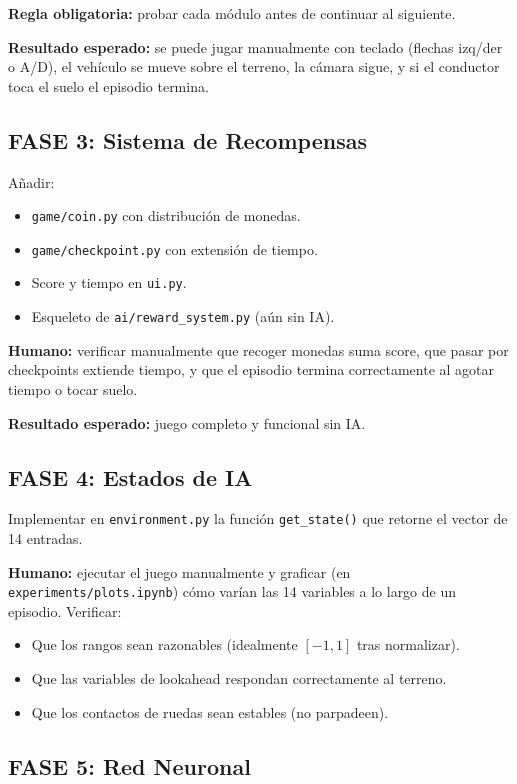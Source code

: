 \documentclass[11pt,a4paper]{article}
\begin{document}
\textbf{Regla obligatoria:} probar cada módulo antes de continuar al siguiente.

\textbf{Resultado esperado:} se puede jugar manualmente con teclado (flechas izq/der o A/D), el vehículo se mueve sobre el terreno, la cámara sigue, y si el conductor toca el suelo el episodio termina.

\subsection{FASE 3: Sistema de Recompensas}

Añadir:
\begin{itemize}
    \item \texttt{game/coin.py} con distribución de monedas.
    \item \texttt{game/checkpoint.py} con extensión de tiempo.
    \item Score y tiempo en \texttt{ui.py}.
    \item Esqueleto de \texttt{ai/reward\_system.py} (aún sin IA).
\end{itemize}

\textbf{Humano:} verificar manualmente que recoger monedas suma score, que pasar por checkpoints extiende tiempo, y que el episodio termina correctamente al agotar tiempo o tocar suelo.

\textbf{Resultado esperado:} juego completo y funcional sin IA.

\subsection{FASE 4: Estados de IA}

Implementar en \texttt{environment.py} la función \texttt{get\_state()} que retorne el vector de 14 entradas.

\textbf{Humano:} ejecutar el juego manualmente y graficar (en \texttt{experiments/plots.ipynb}) cómo varían las 14 variables a lo largo de un episodio. Verificar:
\begin{itemize}
    \item Que los rangos sean razonables (idealmente $[-1, 1]$ tras normalizar).
    \item Que las variables de lookahead respondan correctamente al terreno.
    \item Que los contactos de ruedas sean estables (no parpadeen).
\end{itemize}

\subsection{FASE 5: Red Neuronal}
\end{document}
